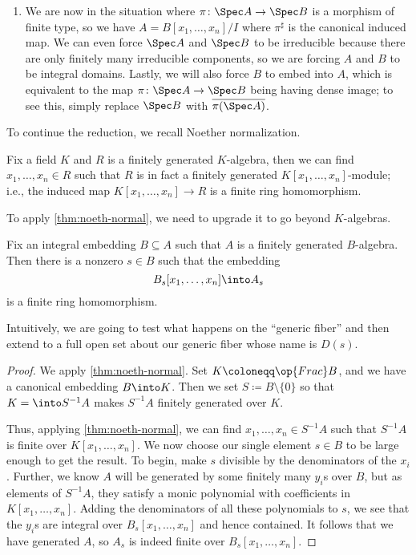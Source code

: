 \documentclass[../notes.tex]{subfiles}
\begin{document}
\begin{enumerate}
	\item We are now in the situation where $\pi\colon\Spec A\to\Spec B$ is a morphism of finite type, so we have $A=B[x_1,\ldots,x_n]/I$ where $\pi^\sharp$ is the canonical induced map. We can even force $\Spec A$ and $\Spec B$ to be irreducible because there are only finitely many irreducible components, so we are forcing $A$ and $B$ to be integral domains. Lastly, we will also force $B$ to embed into $A$, which is equivalent to the map $\pi\colon\Spec A\to\Spec B$ being having dense image; to see this, simply replace $\Spec B$ with $\overline{\pi(\Spec A)}$.
\end{enumerate}
To continue the reduction, we recall Noether normalization.
\begin{theorem} \label{thm:noeth-normal}
	Fix a field $K$ and $R$ is a finitely generated $K$-algebra, then we can find $x_1,\ldots,x_n\in R$ such that $R$ is in fact a finitely generated $K[x_1,\ldots,x_n]$-module; i.e., the induced map $K[x_1,\ldots,x_n]\to R$ is a finite ring homomorphism.
\end{theorem}
To apply \autoref{thm:noeth-normal}, we need to upgrade it to go beyond $K$-algebras.
\begin{lemma}
	Fix an integral embedding $B\subseteq A$ such that $A$ is a finitely generated $B$-algebra. Then there is a nonzero $s\in B$ such that the embedding
	\[B_s[x_1,\ldots,x_n]\into A_s\]
	is a finite ring homomorphism.
\end{lemma}
Intuitively, we are going to test what happens on the ``generic fiber'' and then extend to a full open set about our generic fiber whose name is $D(s)$.
\begin{proof}
	We apply \autoref{thm:noeth-normal}. Set $K\coloneqq\op{Frac}B$, and we have a canonical embedding $B\into K$. Then we set $S\coloneqq B\setminus\{0\}$ so that $K=\into S^{-1}A$ makes $S^{-1}A$ finitely generated over $K$.

	Thus, applying \autoref{thm:noeth-normal}, we can find $x_1,\ldots,x_n\in S^{-1}A$ such that $S^{-1}A$ is finite over $K[x_1,\ldots,x_n]$. We now choose our single element $s\in B$ to be large enough to get the result. To begin, make $s$ divisible by the denominators of the $x_i$. Further, we know $A$ will be generated by some finitely many $y_i$s over $B$, but as elements of $S^{-1}A$, they satisfy a monic polynomial with coefficients in $K[x_1,\ldots,x_n]$. Adding the denominators of all these polynomials to $s$, we see that the $y_i$s are integral over $B_s[x_1,\ldots,x_n]$ and hence contained. It follows that we have generated $A$, so $A_s$ is indeed finite over $B_s[x_1,\ldots,x_n]$.
\end{proof}
\end{document}
